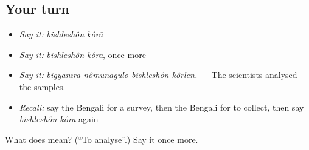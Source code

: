 \subsection*{Your turn}
\begin{itemize}
\raggedright
  \item \emph{Say it:} \emph{bishleshôn kôrā}
  \item \emph{Say it:} \emph{bishleshôn kôrā}, once more
  \item \emph{Say it:} \emph{bigyānīrā nômunāgulo bishleshôn kôrlen.} — The scientists analysed the samples.
  \item \emph{Recall:} say the Bengali for a survey, then the Bengali for to collect, then say \emph{bishleshôn kôrā} again
\end{itemize}

\begin{tcolorbox}[breakable,colback=teal!4,colframe=teal!35!black,title={Before you move on}]
What does   mean? (\textquotedblleft{}To analyse\textquotedblright{}.) Say it once more.
\end{tcolorbox}

